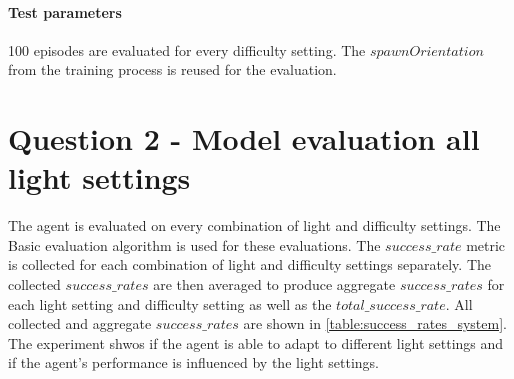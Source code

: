 \paragraph{Test parameters}

100 episodes are evaluated for every difficulty setting. The $spawnOrientation$ from the training process is reused for the evaluation. 


\section{Question 2 - Model evaluation all light settings}

The agent is evaluated on every combination of light and difficulty settings. The Basic evaluation algorithm is used for these evaluations.
The $success\_rate$ metric is collected for each combination of light and difficulty settings separately. The collected $success\_rates$ are then averaged to produce aggregate $success\_rates$ for each light setting and difficulty setting as well as the $total\_success\_rate$. All collected and aggregate $success\_rates$ are shown in \ref{table:success_rates_system}.
The experiment shwos if the agent is able to adapt to different light settings and if the agent's performance is influenced by the light settings.

\begin{table}
\begin{center}
\end{center}
\caption{Collected and aggregate success\_rate metrics}
\label{table:success_rates_system}
\end{table}


